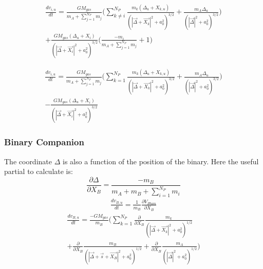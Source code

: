 \documentclass[manuscript]{aastex631}
\begin{document}
\begin{equation}
    \begin{split}
      \frac{dv_{i,u}}{dt} = 
      \frac{GM_{gas}}{m_A+\sum_{j=1}^{N_P}m_j}\biggl(\sum_{k\neq i}^{N_P}\frac{m_k(\Delta_u+X_{k,u})}{(|\vec{\Delta}+\vec{X_k}|^2+a_0^2)^{3/2}}+ 
      \frac{m_A\Delta_u}{(|\vec{\Delta}|^2+a_0^2)^{3/2}} \biggr)\\+
       \frac{GM_{gas}(\Delta_u+X_i)}{(|\vec{\Delta}+\vec{X_i}|^2+a_0^2)^{3/2}}\biggl(\frac{-m_i}{m_A+\sum_{j=1}^{N_P}m_j}+1\biggr)
    \end{split}
\end{equation}


\begin{equation}
    \begin{split}
    \frac{dv_{i,u}}{dt} = 
    \frac{GM_{gas}}{m_A+\sum_{j=1}^{N_P}m_j}\biggl(\sum_{k=1}^{N_P}\frac{m_k(\Delta_u+X_{k,u})}{(|\vec{\Delta}+\vec{X_k}|^2+a_0^2)^{3/2}}+
    \frac{m_A\Delta_u}{(|\vec{\Delta}|^2+a_0^2)^{3/2}} \biggr)\\ - \frac{GM_{gas}(\Delta_u+X_i)}{(|\vec{\Delta}+\vec{X_i}|^2+a_0^2)^{3/2}}   
    \end{split}
\end{equation}

\subsubsection{Binary Companion}
The coordinate $\Delta$ is also a function of the position of the binary. Here the useful partial to calculate is:
\begin{equation}
    \frac{\partial \Delta}{\partial X_B} = \frac{-m_B}{m_A+m_B+\sum_{i=1}^{N_P}m_i}
\end{equation}
\begin{equation}
    \begin{split}
        \frac{dv_{B,u}}{dt}=\frac{1}{m_B}\frac{\partial V_{Plum}}{\partial X_{B}}
\end{split}
\end{equation}
\begin{equation}
    \begin{split}
        \frac{dv_{B,u}}{dt}=\frac{-GM_{gas}}{m_B}\biggl(\sum_{k=1}^{N_P}\frac{\partial}{\partial X_{B}}\frac{m_k}{(|\vec{\Delta}+\vec{X_k}|^2+a_0^2)^{1/2}} \\
        +\frac{\partial}{\partial X_B}\frac{m_B}{(|\vec{\Delta}+\vec{s}+\vec{X_B}|^2+a_0^2)^{1/2}}+\frac{\partial}{\partial X_{B}}\frac{m_A}{(|\vec{\Delta}|^2+a_0^2)^{1/2}} \biggr)
    \end{split}
\end{equation}
\end{document}
